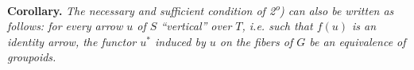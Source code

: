 \documentclass[11pt]{article}
\begin{document}
\textbf{Corollary.} \textit{The necessary and sufficient condition of 2\textsuperscript{o}) can also be written as follows: for every arrow $u$ of $S$ ``vertical'' over $T$, i.e. such that $f(u)$ is an identity arrow, the functor $u^*$ induced by $u$ on the fibers of $G$ be an equivalence of groupoids.}
\end{document}
